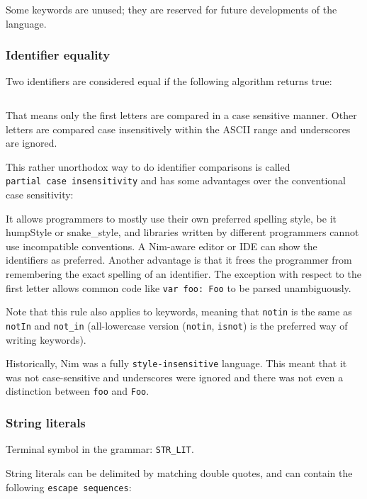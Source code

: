Some keywords are unused; they are reserved for future developments of
the language.

\hypertarget{identifier-equality}{%
\subsubsection{Identifier equality}\label{identifier-equality}}

Two identifiers are considered equal if the following algorithm returns
true:

\begin{verbatim}
\end{verbatim}

That means only the first letters are compared in a case sensitive
manner. Other letters are compared case insensitively within the ASCII
range and underscores are ignored.

This rather unorthodox way to do identifier comparisons is called
\texttt{partial\ case\ insensitivity} and has some advantages over the
conventional case sensitivity:

It allows programmers to mostly use their own preferred spelling style,
be it humpStyle or snake\_style, and libraries written by different
programmers cannot use incompatible conventions. A Nim-aware editor or
IDE can show the identifiers as preferred. Another advantage is that it
frees the programmer from remembering the exact spelling of an
identifier. The exception with respect to the first letter allows common
code like \texttt{var\ foo:\ Foo} to be parsed unambiguously.

Note that this rule also applies to keywords, meaning that
\texttt{notin} is the same as \texttt{notIn} and \texttt{not\_in}
(all-lowercase version (\texttt{notin}, \texttt{isnot}) is the preferred
way of writing keywords).

Historically, Nim was a fully \texttt{style-insensitive} language. This
meant that it was not case-sensitive and underscores were ignored and
there was not even a distinction between \texttt{foo} and \texttt{Foo}.

\hypertarget{string-literals}{%
\subsubsection{String literals}\label{string-literals}}

Terminal symbol in the grammar: \texttt{STR\_LIT}.

String literals can be delimited by matching double quotes, and can
contain the following \texttt{escape\ sequences}:

